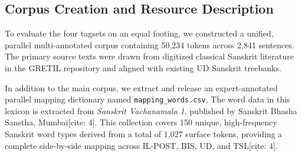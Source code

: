 \documentclass[11pt,a4paper]{article}
\begin{document}
\subsection{Corpus Creation and Resource Description}

To evaluate the four tagsets on an equal footing, we constructed a unified, parallel multi-annotated corpus containing 50,234 tokens across 2,841 sentences. The primary source texts were drawn from digitized classical Sanskrit literature in the GRETIL repository and aligned with existing UD Sanskrit treebanks.

In addition to the main corpus, we extract and release an expert-annotated parallel mapping dictionary named \texttt{mapping\_words.csv}. The word data in this lexicon is extracted from \textit{Sanskrit Vachanamala 1}, published by Sanskrit Bhasha Sanstha, Mumbai[cite: 4]. This collection covers 150 unique, high-frequency Sanskrit word types derived from a total of 1,027 surface tokens, providing a complete side-by-side mapping across IL-POST, BIS, UD, and TSL[cite: 4].

\begin{table}[htbp]
\centering
\caption{Statistics of the Released Parallel Sanskrit POS Corpus and Lexicon Resource.}
\label{tab:corpus_stats}
\end{table}
\end{document}
